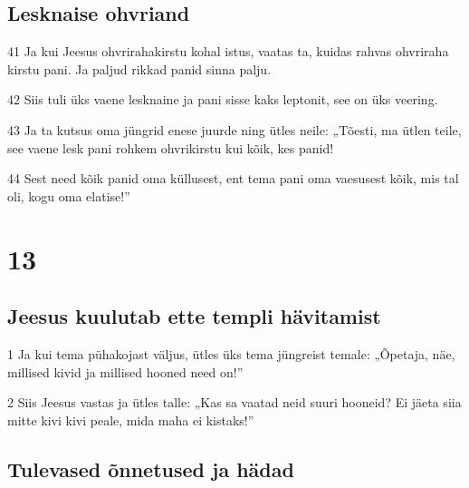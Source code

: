 \section*{Lesknaise ohvriand}

\par 41 Ja kui Jeesus ohvrirahakirstu kohal istus, vaatas ta, kuidas rahvas ohvriraha kirstu pani. Ja paljud rikkad panid sinna palju.
\par 42 Siis tuli üks vaene lesknaine ja pani sisse kaks leptonit, see on üks veering.
\par 43 Ja ta kutsus oma jüngrid enese juurde ning ütles neile: „Tõesti, ma ütlen teile, see vaene lesk pani rohkem ohvrikirstu kui kõik, kes panid!
\par 44 Sest need kõik panid oma küllusest, ent tema pani oma vaesusest kõik, mis tal oli, kogu oma elatise!”


\chapter{13}

\section*{Jeesus kuulutab ette templi hävitamist}

\par 1 Ja kui tema pühakojast väljus, ütles üks tema jüngreist temale: „Õpetaja, näe, millised kivid ja millised hooned need on!”
\par 2 Siis Jeesus vastas ja ütles talle: „Kas sa vaatad neid suuri hooneid? Ei jäeta siia mitte kivi kivi peale, mida maha ei kistaks!”

\section*{Tulevased õnnetused ja hädad}

